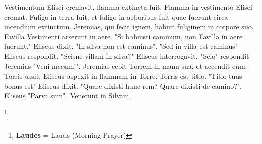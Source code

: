 Vestimentum Elisei cremavit, flamma extincta fuit. Flamma in vestimento Elisei cremat. Fuligo in terra fuit, et fuligo in arboribus fuit quae fuerunt circa incendium extinctum. Jeremias, qui fecit ignem, habuit fuliginem in corpore suo. Favilla Vestimenti arserunt in aere. "Si habuisti caminum, non Favilla in aere fuerunt." Eliseus dixit. "In silva non est caminus". "Sed in villa est caminus" Eliseus respondit. "Scisne villam in silva?" Eliseus interrogavit. "Scio" respondit Jeremias "Veni mecum!". Jeremias cepit Torrem in manu sua, et accendit eum. Torris ussit. Eliseus aspexit in flammam in Torre. Torris est titio. "Titio tuus bonus est" Eliseus dixit. "Quare dixisti hanc rem? Quare dixisti de camino?". Eliseus "Parva sum". Venerunt in Silvam. 

\footnote{\textbf{Laudēs} = Lauds (Morning Prayer)}

